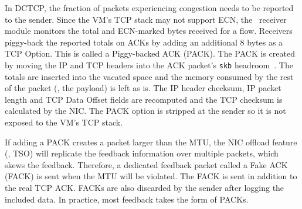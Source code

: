 In DCTCP, the fraction of packets experiencing congestion needs to be reported to the sender. 
Since the VM's TCP stack may not support ECN, the~\acdc{} receiver module monitors
the total and ECN-marked bytes received for a flow. Receivers piggy-back the
reported totals on ACKs by adding an additional 8 bytes as a TCP Option. This is called 
a Piggy-backed ACK (PACK). The PACK is created by moving the IP and TCP headers into
the ACK packet's {\tt skb} headroom~\cite{kernel-skb}. The totals are inserted into the vacated space and the memory
consumed by the rest of the packet (\ie{}, the payload) is left as is. The IP header checksum, IP packet length and TCP Data Offset fields are recomputed and the 
TCP checksum is calculated by the NIC. The PACK option is stripped at the
sender so it is not exposed to the VM's TCP stack. 

If adding a PACK creates a packet larger than the MTU, the NIC offload feature (\ie{}, TSO)
will replicate the feedback information over multiple packets, which skews the feedback.
Therefore, a dedicated feedback packet called a Fake ACK (FACK) is sent when the MTU
will be violated. The FACK is sent in addition to the real TCP ACK.
FACKs are also discarded by the sender after logging the included
data. In practice, most feedback takes the form of PACKs.

%
%

